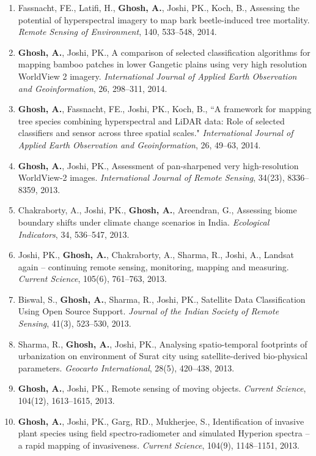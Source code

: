 \documentclass[11pt]{article}
\makeatletter
\newlength{\bibhang}
\newlength{\bibsep}
 {\@listi \global\bibsep\itemsep \global\advance\bibsep by\parsep}
\newenvironment{bibsection}%
        {\begin{enumerate}{}{%
       \setlength{\leftmargin}{\bibhang}%
       \setlength{\itemindent}{-\leftmargin}%
       \setlength{\itemsep}{\bibsep}%
       \setlength{\parsep}{\z@}%
        \setlength{\partopsep}{0pt}%
        \setlength{\topsep}{0pt}}}
        {\end{enumerate}\vspace{-.6\baselineskip}}
\makeatother
\begin{document}
\begin{bibsection}
    \item Fassnacht, FE., Latifi, H., {\bf Ghosh, A.}, Joshi, PK., Koch, B., Assessing the potential of hyperspectral imagery to map bark beetle-induced tree mortality. \emph{Remote Sensing of Environment}, 140, 533--548, 2014.
    \item {\bf Ghosh, A.}, Joshi, PK., A comparison of selected classification algorithms for mapping bamboo patches in lower Gangetic plains using very high resolution\\ WorldView 2 imagery. \emph {International Journal of Applied Earth Observation and Geoinformation}, 26, 298--311, 2014.
    \item {\bf Ghosh, A.}, Fassnacht, FE., Joshi, PK., Koch, B., ``A framework for mapping tree species combining hyperspectral and LiDAR data: Role of selected classifiers and sensor across three spatial scales." \emph {International Journal of Applied Earth Observation and Geoinformation}, 26, 49--63, 2014.
    \item {\bf Ghosh, A.}, Joshi, PK., Assessment of pan-sharpened very high-resolution\\ WorldView-2 images. \emph{International Journal of Remote Sensing}, 34(23), 8336--8359, 2013.
    \item Chakraborty, A., Joshi, PK., {\bf Ghosh, A.}, Areendran, G., Assessing biome boundary shifts under climate change scenarios in India. \emph{Ecological Indicators}, 34, 536--547, 2013.
    \item Joshi, PK., {\bf Ghosh, A.}, Chakraborty, A., Sharma, R., Joshi, A., Landsat again – continuing remote sensing, monitoring, mapping and measuring. \emph{Current Science}, 105(6), 761--763, 2013.
    \item Biswal, S., {\bf Ghosh, A.}, Sharma, R., Joshi, PK., Satellite Data Classification Using Open Source Support. \emph{Journal of the Indian Society of Remote Sensing}, 41(3), 523--530, 2013.
    \item Sharma, R., {\bf Ghosh, A.}, Joshi, PK., Analysing spatio-temporal footprints of \\urbanization on environment of Surat city using satellite-derived bio-physical\\ parameters. \emph{Geocarto International}, 28(5), 420--438, 2013.
    \item {\bf Ghosh, A.}, Joshi, PK., Remote sensing of moving objects. \emph{Current Science}, 104(12), 1613--1615, 2013.
    \item {\bf Ghosh, A.}, Joshi, PK., Garg, RD., Mukherjee, S., Identification of invasive plant species using field spectro-radiometer and simulated Hyperion spectra -- a rapid mapping of invasiveness. \emph{Current Science}, 104(9), 1148--1151, 2013.

\end{bibsection}
\end{document}
